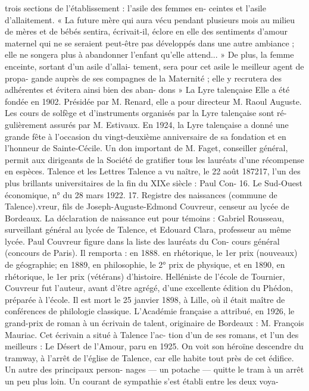 \documentclass[a4paper,11pt]{book}
\begin{document}
trois sections de l'établissement : l'asile des femmes en-
ceintes et l'asile d'allaitement.
« La future mère qui aura vécu pendant plusieurs mois
au milieu de mères et de bébés sentira, écrivait-il, éclore
en elle des sentiments d'amour maternel qui ne se seraient
peut-être pas développés dans une autre ambiance ; elle
ne songera plus à abandonner l'enfant qu'elle attend...
» De plus, la femme enceinte, sortant d'un asile d'allai-
tement, sera pour cet asile le meilleur agent de propa-
gande auprès de ses compagnes de la Maternité ; elle y
recrutera des adhérentes et évitera ainsi bien des aban-
dons »
La Lyre talençaise
Elle a été fondée en 1902. Présidée par M. Renard, elle
a pour directeur M. Raoul Auguste. Les cours de solfège
et d'instruments organisés par la Lyre talençaise sont ré-
gulièrement assurés par M. Estivaux.
En 1924, la Lyre talençaise a donné une grande fête à
l'occasion du vingt-deuxième anniversaire de sa fondation
et en l'honneur de Sainte-Cécile. Un don important de
M. Faget, conseiller général, permit aux dirigeants de la
Société de gratifier tous les lauréats d'une récompense
en espèces.
Talence et les Lettres
Talence a vu naître, le 22 août 187217, l'un des plus
brillants universitaires de la fin du XIXe siècle : Paul Con-
16. Le Sud-Ouest économique, n° du 28 mars 1922.
17. Registre des naissances (commune de Talence).vreur, fils de Joseph-Auguste-Edmond Couvreur, censeur
au lycée de Bordeaux.
La déclaration de naissance eut pour témoins : Gabriel
Rousseau, surveillant général au lycée de Talence, et
Edouard Clara, professeur au même lycée.
Paul Couvreur figure dans la liste des lauréats du Con-
cours général (concours de Paris). Il remporta : en 1888.
en rhétorique, le 1er prix (nouveaux) de géographie; en
1889, en philosophie, le 2° prix de physique, et en 1890,
en rhétorique, le 1er prix (vétérans) d'histoire.
Helléniste de l'école de Tournier, Couvreur fut l'auteur,
avant d'être agrégé, d'une excellente édition du Phédon,
préparée à l'école. Il est mort le 25 janvier 1898, à Lille,
où il était maître de conférences de philologie classique.
L'Académie française a attribué, en 1926, le grand-prix
de roman à un écrivain de talent, originaire de Bordeaux :
M. François Mauriac. Cet écrivain a situé à Talence l'ac-
tion d'un de ses romans, et l'un des meilleurs : Le Désert de
l'Amour, paru en 1925. On voit son héroïne descendre du
tramway, à l'arrêt de l'église de Talence, car elle habite
tout près de cet édifice. Un autre des principaux person-
nages — un potache — quitte le tram à un arrêt un peu plus
loin.
Un courant de sympathie s'est établi entre les deux voya-
\end{document}
